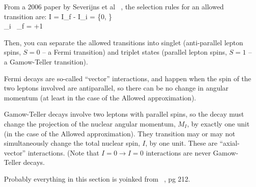 	From a 2006 paper by Severijns et al ~\cite{severijns_beck_cuncic_2006}, the selection rules for an allowed transition are:
\bea
\Delta I = I_f - I_i = \{0, \} \\ 
\hat{\Pi}_i \, \hat{\Pi}_f = +1
\eea

	Then, you can separate the allowed transitions into singlet (anti-parallel lepton spins, $S=0$ -- a Fermi transition) and triplet states (parallel lepton spins, $S=1$ -- a Gamow-Teller transition).
	
	
	Fermi decays are so-called ``vector'' interactions, and happen when the spin of the two leptons involved are antiparallel, so there can be no change in angular momentum (at least in the case of the Allowed approximation).  
	
	Gamow-Teller decays involve two leptons with parallel spins, so the decay must change the projection of the nuclear angular momentum, $M_I$, by exactly one unit (in the case of the Allowed approximation).  They transition may or may not simultaneously change the total nuclear spin, $I$, by one unit.  These are ``axial-vector'' interactions.  (Note that $I=0 \rightarrow I=0$ interactions are never Gamow-Teller decays.  
	
	Probably everything in this section is yoinked from ~\cite{wong1990}, pg 212.  
	
	
%	
%	
%	
%
%
%
%
%
%
